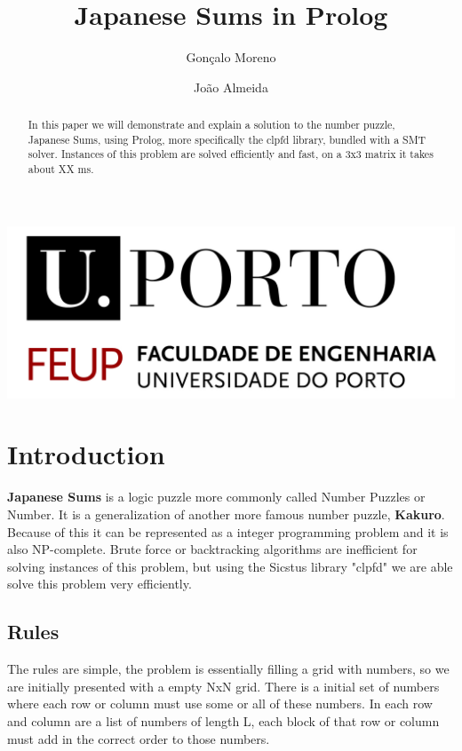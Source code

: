 \documentclass{llncs}
\begin{document}
\title{Japanese Sums in Prolog}
%
%
\author{Gonçalo Moreno \and João Almeida}
%
%


\maketitle              %


    \includegraphics[width=\textwidth]{FEUP.jpg}
  


\begin{abstract}
In this paper we will demonstrate and explain a solution to the number puzzle, Japanese Sums, using Prolog, more specifically the clpfd library, bundled with a SMT solver. Instances of this problem are solved efficiently and fast, on a 3x3 matrix it takes about XX ms. 
\end{abstract}
%
\section{Introduction}
%
\textbf{Japanese Sums} is a logic puzzle more commonly called Number Puzzles or Number. It is a generalization of another more famous number puzzle, \textbf{Kakuro}. Because of this it can be represented as a integer programming problem and it is also NP-complete\cite{np_kakuro}. Brute force or backtracking algorithms are inefficient for solving instances of this problem, but using the Sicstus library "clpfd" we are able solve this problem very efficiently.
% 
\subsection{Rules}
%
The rules are simple, the problem is essentially filling a grid with numbers, so we are initially presented with a empty NxN grid. There is a initial set of numbers where each row or column must use some or all of these numbers. In each row and column are a list of numbers of length L, each block of that row or column must add  
in the correct order to those numbers.
\end{document}
